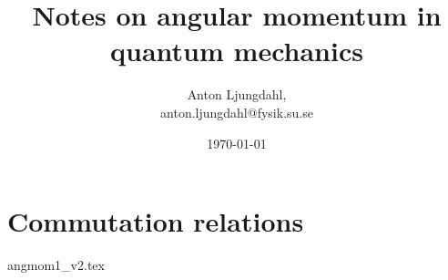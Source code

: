 \documentclass[12pt,a4paper]{article}
\numberwithin{equation}{section}
\begin{document}
\author{Anton Ljungdahl, \\
\small{anton.ljungdahl@fysik.su.se}}
\title{Notes on angular momentum in quantum mechanics}
\date{\today}
\maketitle
\tableofcontents
\section{Commutation relations}
{angmom1_v2.tex}
\end{document}
